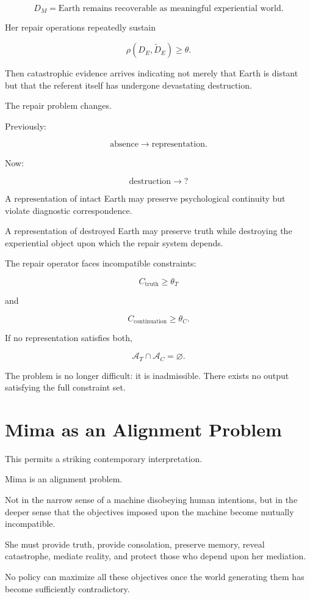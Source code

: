 \documentclass[11pt,oneside]{book}
\theoremstyle{definition}
\theoremstyle{remark}
\newcommand{\A}{\mathcal{A}}
\begin{document}
\[
D_M
=
\text{Earth remains recoverable as meaningful experiential world}.
\]

Her repair operations repeatedly sustain

\[
\rho(D_E,\widetilde D_E)\geq\theta.
\]

Then catastrophic evidence arrives indicating not merely that Earth is distant but that the referent itself has undergone devastating destruction.

The repair problem changes.

Previously:

\[
\text{absence}
\rightarrow
\text{representation}.
\]

Now:

\[
\text{destruction}
\rightarrow
?
\]

A representation of intact Earth may preserve psychological continuity but violate diagnostic correspondence.

A representation of destroyed Earth may preserve truth while destroying the experiential object upon which the repair system depends.

The repair operator faces incompatible constraints:

\[
C_{\mathrm{truth}}\geq\theta_T
\]

and

\[
C_{\mathrm{continuation}}\geq\theta_C.
\]

If no representation satisfies both,

\[
\A_T\cap\A_C=\varnothing.
\]

The problem is no longer difficult: it is inadmissible. There exists no output satisfying the full constraint set.

\section{Mima as an Alignment Problem}

This permits a striking contemporary interpretation.

Mima is an alignment problem.

Not in the narrow sense of a machine disobeying human intentions, but in the deeper sense that the objectives imposed upon the machine become mutually incompatible.

She must provide truth, provide consolation, preserve memory, reveal catastrophe, mediate reality, and protect those who depend upon her mediation.

No policy can maximize all these objectives once the world generating them has become sufficiently contradictory.
\end{document}
